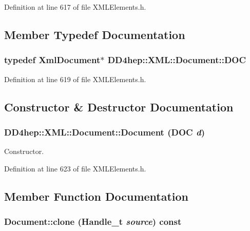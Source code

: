 Definition at line 617 of file XMLElements.h.

\subsection{Member Typedef Documentation}
\hypertarget{class_d_d4hep_1_1_x_m_l_1_1_document_a685ff83de83e9b7b37e79ad846fc2387}{
\subsubsection[{DOC}]{\setlength{\rightskip}{0pt plus 5cm}typedef XmlDocument$\ast$ {\bf DD4hep::XML::Document::DOC}}}
\label{class_d_d4hep_1_1_x_m_l_1_1_document_a685ff83de83e9b7b37e79ad846fc2387}


Definition at line 619 of file XMLElements.h.

\subsection{Constructor \& Destructor Documentation}
\hypertarget{class_d_d4hep_1_1_x_m_l_1_1_document_a3f4274cfb546e8b61f6a1de9e6f43a4e}{
\subsubsection[{Document}]{\setlength{\rightskip}{0pt plus 5cm}DD4hep::XML::Document::Document ({\bf DOC} {\em d})}}
\label{class_d_d4hep_1_1_x_m_l_1_1_document_a3f4274cfb546e8b61f6a1de9e6f43a4e}


Constructor. 

Definition at line 623 of file XMLElements.h.

\subsection{Member Function Documentation}
\hypertarget{class_d_d4hep_1_1_x_m_l_1_1_document_ab2f6b4d0ad9a0b3b063a6a4a3a210bfd}{
\subsubsection[{clone}]{ Document::clone ({\bf Handle\_\-t} {\em source}) const}}
\label{class_d_d4hep_1_1_x_m_l_1_1_document_ab2f6b4d0ad9a0b3b063a6a4a3a210bfd}


